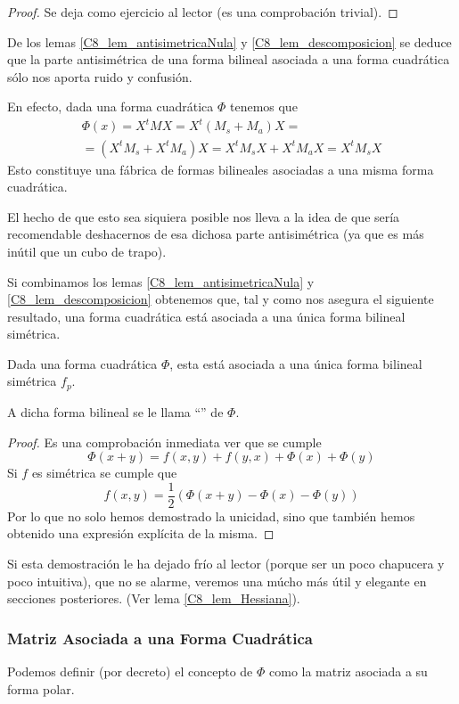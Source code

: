 \begin{proof}
	Se deja como ejercicio al lector (es una comprobación trivial).
\end{proof}
\begin{obs}
	De los lemas \ref{C8_lem_antisimetricaNula} y \ref{C8_lem_descomposicion} se deduce que la parte antisimétrica de una forma bilineal asociada a una forma cuadrática sólo nos aporta ruido y confusión.
	
	En efecto, dada una forma cuadrática $\Phi$ tenemos que
	\begin{multline}\Phi(x)=X^tMX=X^t(M_s+M_a)X=\\=(X^tM_s+X^tM_a)X=X^tM_sX+X^tM_aX=X^tM_sX\end{multline}
	Esto constituye una fábrica de formas bilineales asociadas a una misma forma cuadrática.
	
	El hecho de que esto sea siquiera posible nos lleva a la idea de que sería recomendable deshacernos de esa dichosa parte antisimétrica (ya que es más inútil que un cubo de trapo).
\end{obs}
Si combinamos los lemas \ref{C8_lem_antisimetricaNula} y \ref{C8_lem_descomposicion} obtenemos que, tal y como nos asegura el siguiente resultado, una forma cuadrática está asociada a una única forma bilineal simétrica.
\begin{prop}
	Dada una forma cuadrática $\Phi$, esta está asociada a una única forma bilineal simétrica $f_p$.
	
	A dicha forma bilineal se le llama ``'' de $\Phi$.
\end{prop}
\begin{proof}
	Es una comprobación inmediata ver que se cumple
	\[\Phi(x+y)=f(x,y)+f(y,x)+\Phi(x)+\Phi(y)\]
	Si $f$ es simétrica se cumple que
	\[f(x,y)=\frac{1}{2}\left(\Phi(x+y)-\Phi(x)-\Phi(y)\right)\]
	Por lo que no solo hemos demostrado la unicidad, sino que también hemos obtenido una expresión explícita de la misma.
\end{proof}
Si esta demostración le ha dejado frío al lector (porque ser un poco chapucera y poco intuitiva), que no se alarme, veremos una múcho más útil y elegante en secciones posteriores. (Ver lema \ref{C8_lem_Hessiana}).
\subsubsection{Matriz Asociada a una Forma Cuadrática}
Podemos definir (por decreto) el concepto de  $\Phi$ como la matriz asociada a su forma polar.

